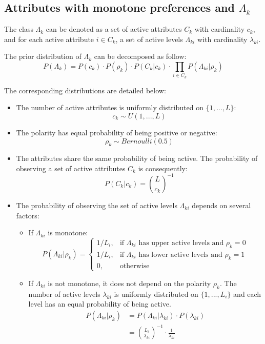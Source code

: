 \documentclass[12pt]{article}
\begin{document}
\subsection{Attributes with monotone preferences and $\Lambda_k$} \label{sec:lambda}

The class $\Lambda_k$ can be denoted as a set of active attributes $C_k$ with cardinality $c_k$, and for each active attribute $i\in C_k$, a set of active levels $\Lambda_{ki}$ with cardinality $\lambda_{ki}$.

The prior distribution of $\Lambda_k$ can be decomposed as follow:
\begin{equation}
	P(\Lambda_{k}) = P(c_k) \cdot P(\rho_k) \cdot P(C_k|c_k) \cdot \prod_{i\in C_k} P(\Lambda_{ki}|\rho_k)
\end{equation}

The corresponding distributions are detailed below:
\begin{itemize}
	\item The number of active attributes is uniformly distributed on $\{1,...,L\}$:
	$$c_k \sim U(1,...,L)$$
	\item The polarity has equal probability of being positive or negative:
	$$\rho_k \sim Bernoulli(0.5)$$
	\item The attributes share the same probability of being active. The probability of observing a set of active attributes $C_k$ is consequently:
	$$ P(C_k|c_k) = \binom{L}{c_k}^{-1}$$ 
	\item The probability of observing the set of active levels $\Lambda_{ki}$ depends on several factors:
	\begin{itemize}
		\item If $\Lambda_{ki}$ is monotone:
		$$P(\Lambda_{ki}|\rho_k) =  
			\begin{cases}
				1/L_i,& \text{if } \Lambda_{ki} \text{ has upper active levels and } \rho_k = 0\\
				1/L_i,& \text{if } \Lambda_{ki} \text{ has lower active levels and } \rho_k = 1\\
				0,              & \text{otherwise}
			\end{cases}
		$$
		\item If $\Lambda_{ki}$ is not monotone, it does not depend on the polarity $\rho_k$. The number of active levels $\lambda_{ki}$ is uniformly distributed on $\{1,...,L_i\}$ and each level has an equal probability of being active.
		\begin{align*}
			P(\Lambda_{ki}|\rho_k) & = P(\Lambda_{ki}|\lambda_{ki})\cdot P(\lambda_{ki}) \\
				& = \binom{L_i}{\lambda_{ki}}^{-1} \cdot \frac{1}{\lambda_{ki}}
		\end{align*}
	\end{itemize}
\end{itemize}
\end{document}

